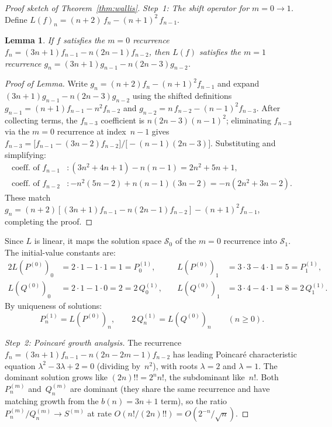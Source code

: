 \documentclass[11pt]{article}
\newtheorem{lemma}[theorem]{Lemma}
\theoremstyle{remark}
\begin{document}
\begin{proof}[Proof sketch of Theorem~\ref{thm:wallis}]
\emph{Step~1: The shift operator for $m=0\to 1$.}
Define $L(f)_n = (n{+}2)\,f_n - (n{+}1)^2\,f_{n-1}$.

\begin{lemma}\label{lem:shift}
If $f$ satisfies the $m{=}0$ recurrence
$f_n = (3n{+}1)f_{n-1} - n(2n{-}1)f_{n-2}$,
then $L(f)$ satisfies the $m{=}1$ recurrence
$g_n = (3n{+}1)g_{n-1} - n(2n{-}3)g_{n-2}$.
\end{lemma}

\begin{proof}[Proof of Lemma]
Write $g_n = (n{+}2)f_n - (n{+}1)^2 f_{n-1}$ and expand
$(3n{+}1)g_{n-1} - n(2n{-}3)g_{n-2}$ using the shifted definitions
$g_{n-1} = (n{+}1)f_{n-1} - n^2 f_{n-2}$ and
$g_{n-2} = n\,f_{n-2} - (n{-}1)^2 f_{n-3}$.
After collecting terms, the $f_{n-3}$ coefficient is
$n(2n{-}3)(n{-}1)^2$; eliminating $f_{n-3}$ via the $m{=}0$
recurrence at index~$n{-}1$ gives
$f_{n-3} = \bigl[f_{n-1} - (3n{-}2)f_{n-2}\bigr]
           \big/\bigl[{-}(n{-}1)(2n{-}3)\bigr]$.
Substituting and simplifying:
\begin{align*}
  \text{coeff. of } f_{n-1} &:
    (3n^2{+}4n{+}1) - n(n{-}1) = 2n^2{+}5n{+}1, \\
  \text{coeff. of } f_{n-2} &:
    {-}n^2(5n{-}2) + n(n{-}1)(3n{-}2)
    = {-}n(2n^2{+}3n{-}2).
\end{align*}
These match $g_n = (n{+}2)[(3n{+}1)f_{n-1} - n(2n{-}1)f_{n-2}]
- (n{+}1)^2 f_{n-1}$, completing the proof.
\end{proof}

Since $L$ is linear, it maps the solution space
$\mathcal{S}_0$ of the $m{=}0$ recurrence into $\mathcal{S}_1$.
The initial-value constants are:
\begin{alignat*}{2}
  L(P^{(0)})_0 &= 2\cdot 1 - 1\cdot 1 = 1 = P_0^{(1)},\quad
  &L(P^{(0)})_1 &= 3\cdot 3 - 4\cdot 1 = 5 = P_1^{(1)},\\
  L(Q^{(0)})_0 &= 2\cdot 1 - 1\cdot 0 = 2 = 2\,Q_0^{(1)},\quad
  &L(Q^{(0)})_1 &= 3\cdot 4 - 4\cdot 1 = 8 = 2\,Q_1^{(1)}.
\end{alignat*}
By uniqueness of solutions:
\begin{equation}\label{eq:LPQ}
  P_n^{(1)} = L(P^{(0)})_n,\qquad
  2\,Q_n^{(1)} = L(Q^{(0)})_n
  \qquad(n \geq 0).
\end{equation}

\emph{Step~2: Poincar\'{e} growth analysis.}
The recurrence $f_n = (3n{+}1)f_{n-1} - n(2n{-}2m{-}1)f_{n-2}$
has leading Poincar\'e characteristic equation
$\lambda^2 - 3\lambda + 2 = 0$ (dividing by~$n^2$),
with roots $\lambda = 2$ and $\lambda = 1$.
The dominant solution grows like $(2n)!! = 2^n n!$,
the subdominant like~$n!$.
Both $P_n^{(m)}$ and~$Q_n^{(m)}$ are dominant (they share
the same recurrence and have matching growth from the
$b(n) = 3n{+}1$ term), so the ratio
$P_n^{(m)}/Q_n^{(m)} \to S^{(m)}$ at rate $O(n!/(2n)!!) = O(2^{-n}/\sqrt{n})$.


\end{proof}
\end{document}
